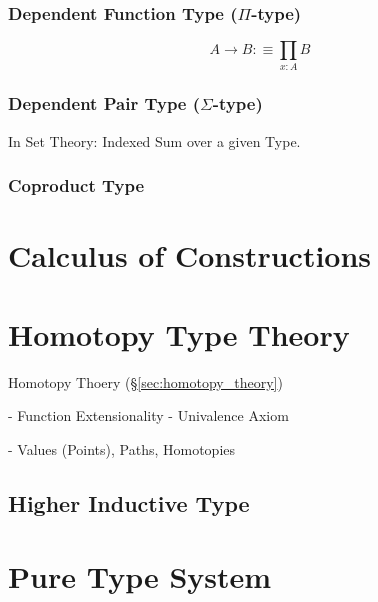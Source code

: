 \subsubsection{Dependent Function Type ($\Pi$-type)}

\[
  A \rightarrow B :\equiv \prod_{x:A} B
\]

\subsubsection{Dependent Pair Type ($\Sigma$-type)}

In Set Theory: Indexed Sum over a given Type.

\subsubsection{Coproduct Type}



\section{Calculus of Constructions}\label{sec:coq}



\section{Homotopy Type Theory}\label{sec:homotopy_type}

Homotopy Thoery (\S\ref{sec:homotopy_theory})

- Function Extensionality
- Univalence Axiom

- Values (Points), Paths, Homotopies


\subsection{Higher Inductive Type}\label{sec:higher_inductive_type}



\section{Pure Type System}\label{sec:pure_type_system}

